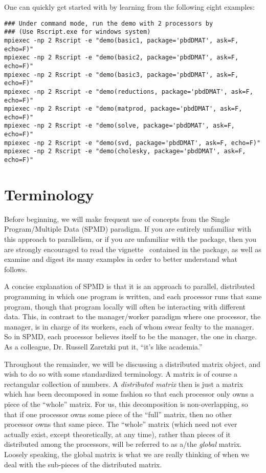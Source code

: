 One can quickly get started with  by learning from the following eight examples:
\begin{lstlisting}[title=Shell Script]
### Under command mode, run the demo with 2 processors by
### (Use Rscript.exe for windows system)
mpiexec -np 2 Rscript -e "demo(basic1, package='pbdDMAT', ask=F, echo=F)"
mpiexec -np 2 Rscript -e "demo(basic2, package='pbdDMAT', ask=F, echo=F)"
mpiexec -np 2 Rscript -e "demo(basic3, package='pbdDMAT', ask=F, echo=F)"
mpiexec -np 2 Rscript -e "demo(reductions, package='pbdDMAT', ask=F, echo=F)"
mpiexec -np 2 Rscript -e "demo(matprod, package='pbdDMAT', ask=F, echo=F)"
mpiexec -np 2 Rscript -e "demo(solve, package='pbdDMAT', ask=F, echo=F)"
mpiexec -np 2 Rscript -e "demo(svd, package='pbdDMAT', ask=F, echo=F)"
mpiexec -np 2 Rscript -e "demo(cholesky, package='pbdDMAT', ask=F, echo=F)"
\end{lstlisting}





\section{Terminology}
Before beginning, we will make frequent use of concepts from the Single Program/Multiple Data (SPMD) paradigm.  If you are entirely unfamiliar with this approach to parallelism, or if you are unfamiliar with the  package, then you are strongly encouraged to read the vignette~\citep{Chen2012pbdMPIvignette} contained in the  package, as well as examine and digest its many examples in order to better understand what follows.

A concise explanation of SPMD is that it is an approach to parallel, distributed programming in which one program is written, and each processor runs that same program, though that program locally will often be interacting with different data.  This, in contrast to the manager/worker paradigm where one processor, the manager, is in charge of its workers, each of whom swear fealty to the manager.  So in SPMD, each processor believes itself to be the manager, the one in charge.  As a colleague, Dr. Russell Zaretzki put it, ``it's like academia.''

Throughout the remainder, we will be discussing a distributed matrix object, and wish to do so with some standardized terminology.  A matrix is of course a rectangular collection of numbers.  A \emph{distributed matrix} then is just a matrix which has been decomposed in some fashion so that each processor only owns a piece of the ``whole'' matrix.  For us, this decomposition is non-overlapping, so that if one processor owns some piece of the ``full'' matrix, then no other processor owns that same piece.  The ``whole'' matrix (which need not ever actually exist, except theoretically, at any time), rather than pieces of it distributed among the processors, will be referred to as a/the \emph{global} matrix.  Loosely speaking, the global matrix is what we are really thinking of when we deal with the sub-pieces of the distributed matrix.  

